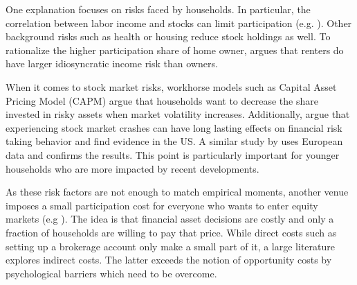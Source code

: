 \documentclass[ProjectABM]{subfiles}
\begin{document}
One explanation focuses on risks faced by households. In particular, the correlation between labor income and stocks can limit participation (e.g. \cite{BCG2007stocklabor}). Other background risks such as health \citep{GJT1996_health} or housing \citep{cocco2005housing} reduce stock holdings as well. To rationalize the higher participation share of home owner, \cite{catherine2020_countercyclical} argues that renters do have larger idiosyncratic income risk than owners.%

When it comes to stock market risks, workhorse models such as Capital Asset Pricing Model (CAPM) argue that households want to decrease the share invested in risky assets when market volatility increases. Additionally, \cite{malmendier_2011} argue that experiencing stock market crashes can have long lasting effects on financial risk taking behavior and find evidence in the US. A similar study by \cite{ampudia_ehrmann_2017macroeconomic} uses European data and confirms the results. This point is particularly important for younger households who are more impacted by recent developments.

As these risk factors are not enough to match empirical moments, another venue imposes a small participation cost for everyone who wants to enter equity markets (e.g \cite{vissing_2003, HM2003portfolio, GM2005portfolio}). The idea is that financial asset decisions are costly and only a fraction of households are willing to pay that price. While direct costs such as setting up a brokerage account only make a small part of it, a large literature explores indirect costs.  The latter exceeds the notion of opportunity costs by psychological barriers which need to be overcome. %
\end{document}
